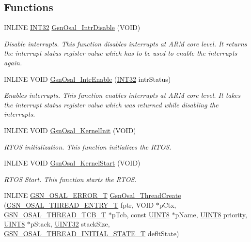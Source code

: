 \subsection*{Functions}
\begin{DoxyCompactItemize}
\item 
INLINE \hyperlink{a00660_ga63021d67d54286c2163bcdb43a6f2569}{INT32} \hyperlink{a00628_ga1ed551b8d69faf123769e95f1d1a6a7b}{GsnOsal\_\-IntrDisable} (VOID)
\begin{DoxyCompactList}\small\item\em Disable interrupts. This function disables interrupts at ARM core level. It returns the interrupt status register value which has to be used to enable the interrupts again. \end{DoxyCompactList}\item 
INLINE VOID \hyperlink{a00628_ga2b636bd2ea78e766272d3b316fc56caf}{GsnOsal\_\-IntrEnable} (\hyperlink{a00660_ga63021d67d54286c2163bcdb43a6f2569}{INT32} intrStatus)
\begin{DoxyCompactList}\small\item\em Enables interrupts. This function enables interrupts at ARM core level. It takes the interrupt status register value which was returned while disabling the interrupts. \end{DoxyCompactList}\item 
INLINE VOID \hyperlink{a00628_gae0bcbaa3cb7b92d2df26e8894b6b4ee3}{GsnOsal\_\-KernelInit} (VOID)
\begin{DoxyCompactList}\small\item\em RTOS initialization. This function initializes the RTOS. \end{DoxyCompactList}\item 
INLINE VOID \hyperlink{a00628_gafe9fabb4c27bd3a4544da84919cd1789}{GsnOsal\_\-KernelStart} (VOID)
\begin{DoxyCompactList}\small\item\em RTOS Start. This function starts the RTOS. \end{DoxyCompactList}\item 
INLINE \hyperlink{a00659_ga36216a7aacd1d5024bc7b8bf39c3f46b}{GSN\_\-OSAL\_\-ERROR\_\-T} \hyperlink{a00628_ga1b2c29cb19f0f5a40f765072e570ee83}{GsnOsal\_\-ThreadCreate} (\hyperlink{a00628_ga62a09641cac90719fc0cdb5f204df09b}{GSN\_\-OSAL\_\-THREAD\_\-ENTRY\_\-T} fptr, VOID $\ast$pCtx, \hyperlink{a00628_ga43c1eefe78fa26e478301976f96ac31f}{GSN\_\-OSAL\_\-THREAD\_\-TCB\_\-T} $\ast$pTcb, const \hyperlink{a00660_gab27e9918b538ce9d8ca692479b375b6a}{UINT8} $\ast$pName, \hyperlink{a00660_gab27e9918b538ce9d8ca692479b375b6a}{UINT8} priority, \hyperlink{a00660_gab27e9918b538ce9d8ca692479b375b6a}{UINT8} $\ast$pStack, \hyperlink{a00660_gae1e6edbbc26d6fbc71a90190d0266018}{UINT32} stackSize, \hyperlink{a00628_ga0aaa82e357c4ce95100dc1df18ec3363}{GSN\_\-OSAL\_\-THREAD\_\-INITIAL\_\-STATE\_\-T} defltState)

\end{DoxyCompactItemize}
